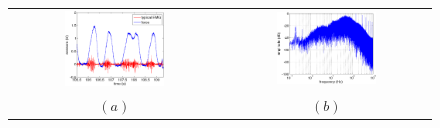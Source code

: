 \documentclass{article}
\begin{document}

\begin{figure}[!ht] \centering
  \begin{tabular}{cc}
    \includegraphics[width=0.50\textwidth]{force_raw.eps} &
    \includegraphics[width=0.50\textwidth]{spectrum_raw.eps} \\
    $(a)$ & $(b)$ \\
  \end{tabular}
\end{figure}
\end{document}
